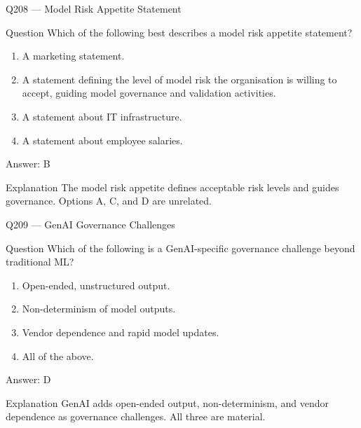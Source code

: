 \documentclass[aspectratio=169,8pt]{beamer}
\begin{document}
															\begin{frame}{Q208 --- Model Risk Appetite Statement}
																\begin{block}{Question}
																	Which of the following best describes a model risk appetite statement?
																	\begin{enumerate}
																		\item A marketing statement.
																		\item A statement defining the level of model risk the organisation is willing to accept, guiding model governance and validation activities.
																		\item A statement about IT infrastructure.
																		\item A statement about employee salaries.
																	\end{enumerate}  \end{block}
																	\begin{exampleblock}{Answer: B}\end{exampleblock}
																	\begin{block}{Explanation}
																		The model risk appetite defines acceptable risk levels and guides governance. Options A, C, and D are unrelated.
																	\end{block}
																\end{frame}
																
																\begin{frame}{Q209 --- GenAI Governance Challenges}
																	\begin{block}{Question}
																		Which of the following is a GenAI-specific governance challenge beyond traditional ML?
																		\begin{enumerate}
																			\item Open-ended, unstructured output.
																			\item Non-determinism of model outputs.
																			\item Vendor dependence and rapid model updates.
																			\item All of the above.
																		\end{enumerate}  \end{block}
																		\begin{exampleblock}{Answer: D}\end{exampleblock}
																		\begin{block}{Explanation}
																			GenAI adds open-ended output, non-determinism, and vendor dependence as governance challenges. All three are material.
																		\end{block}
																	\end{frame}
																	
\end{document}
